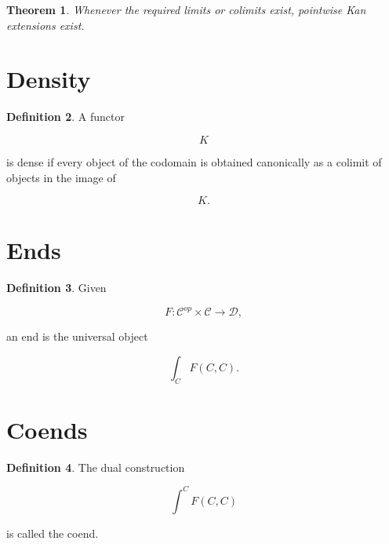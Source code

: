\documentclass[11pt]{book}
\numberwithin{equation}{chapter}
\theoremstyle{definition}
\newtheorem{definition}{Definition}[chapter]
\theoremstyle{plain}
\newtheorem{theorem}[definition]{Theorem}
\begin{document}

\begin{theorem}

Whenever the required limits or colimits exist, pointwise Kan
extensions exist.

\end{theorem}


\section{Density}

\begin{definition}

A functor

\[
K
\]

is dense if every object of the codomain is obtained canonically as a
colimit of objects in the image of

\[
K.
\]

\end{definition}


\section{Ends}

\begin{definition}

Given

\[
F:
\mathcal C^{op}
\times
\mathcal C
\rightarrow
\mathcal D,
\]

an end is the universal object

\[
\int_C
F(C,C).
\]

\end{definition}


\section{Coends}

\begin{definition}

The dual construction

\[
\int^{C}
F(C,C)
\]

is called the coend.

\end{definition}
\end{document}
